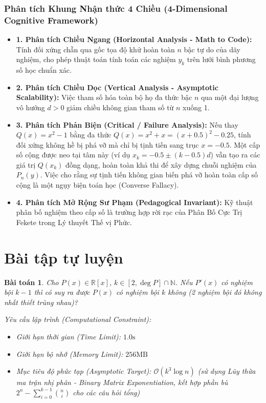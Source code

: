 \documentclass{article}
\newtheorem{baitoan}{Bài toán}
\begin{document}
\subsubsection*{Phân tích Khung Nhận thức 4 Chiều (4-Dimensional Cognitive Framework)}
\begin{itemize}
    \item \textbf{1. Phân tích Chiều Ngang (Horizontal Analysis - Math to Code):} Tính đối xứng chẵn qua gốc tọa độ khử hoàn toàn $n$ bậc tự do của dãy nghiệm, cho phép thuật toán tính toán các nghiệm $y_k$ trên lưới bình phương số học chuẩn xác.
    \item \textbf{2. Phân tích Chiều Dọc (Vertical Analysis - Asymptotic Scalability):} Việc tham số hóa toàn bộ họ đa thức bậc $n$ qua một đại lượng vô hướng $d > 0$ giảm chiều không gian tham số từ $n$ xuống 1.
    \item \textbf{3. Phân tích Phản Biện (Critical / Failure Analysis):} Nếu thay $Q(x) = x^2 - 1$ bằng đa thức $Q(x) = x^2 + x = (x+0.5)^2 - 0.25$, tính đối xứng không hề bị phá vỡ mà chỉ bị tịnh tiến sang trục $x = -0.5$. Một cấp số cộng được neo tại tâm này (ví dụ $x_k = -0.5 \pm (k - 0.5)d$) vẫn tạo ra các giá trị $Q(x_k)$ đồng dạng, hoàn toàn khả thi để xây dựng chuỗi nghiệm của $P_n(y)$. Việc cho rằng sự tịnh tiến không gian biến phá vỡ hoàn toàn cấp số cộng là một ngụy biện toán học (Converse Fallacy).
    \item \textbf{4. Phân tích Mở Rộng Sư Phạm (Pedagogical Invariant):} Kỹ thuật phân bố nghiệm theo cấp số là trường hợp rời rạc của Phân Bố Cực Trị Fekete trong Lý thuyết Thế vị Phức.
\end{itemize}

\section{Bài tập tự luyện}

\begin{baitoan}
	Cho $P(x)\in\mathbb{R}[x]$, $k\in[2,\deg P]\cap\mathbb{N}$. Nếu $P'(x)$ có nghiệm bội $k - 1$ thì có suy ra được $P(x)$ có nghiệm bội $k$ không (2 nghiệm bội đó không nhất thiết trùng nhau)?

    \vspace{0.5em}
    \emph{Yêu cầu lập trình (Computational Constraint):}
    \begin{itemize}
        \item Giới hạn thời gian (Time Limit): $1.0\mathrm{s}$
        \item Giới hạn bộ nhớ (Memory Limit): $256\mathrm{MB}$
        \item Mục tiêu độ phức tạp (Asymptotic Target): $\mathcal{O}(k^3 \log n)$ (sử dụng Lũy thừa ma trận nhị phân - Binary Matrix Exponentiation, kết hợp phần bù $2^n - \sum_{i=0}^{k-1} \binom{n}{i}$ cho các câu hỏi tổng)
    \end{itemize}
\end{baitoan}
\end{document}

